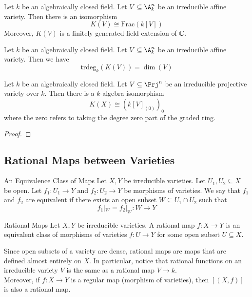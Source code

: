 \documentclass[a4paper]{article}
\begin{document}
\begin{prp}{}{} Let $k$ be an algebraically closed field. Let $V\subseteq\A_k^n$ be an irreducible affine variety. Then there is an isomorphism $$K(V)\cong\text{Frac}(k[V])$$ Moreover, $K(V)$ is a finitely generated field extension of $\mathbb{C}$. 
\end{prp}

\begin{prp}{}{} Let $k$ be an algebraically closed field. Let $V\subseteq\A_k^n$ be an irreducible affine variety. Then we have $$\text{trdeg}_k(K(V))=\dim(V)$$
\end{prp}

\begin{prp}{}{} Let $k$ be an algebraically closed field. Let $V\subseteq\Prj^n$ be an irreducible projective variety over $k$. Then there is a $k$-algebra isomorphism $$K(X)\cong(k[V]_{(0)})_0$$ where the zero refers to taking the degree zero part of the graded ring. 
\begin{proof}
\end{proof}
\end{prp}

\subsection{Rational Maps between Varieties}
\begin{defn}{An Equivalence Class of Maps}{} Let $X,Y$ be irreducible varieties. Let $U_1,U_2\subseteq X$ be open. Let $f_1:U_1\to Y$ and $f_2:U_2\to Y$ be morphisms of varieties. We say that $f_1$ and $f_2$ are equivalent if there exists an open subset $W\subseteq U_1\cap U_2$ such that $$f_1|_W=f_2|_W:W\to Y$$
\end{defn}

\begin{defn}{Rational Maps}{} Let $X,Y$ be irreducible varieties. A rational map $f:X\to Y$ is an equivalent class of morphisms of varieties $f:U\to Y$ for some open subset $U\subseteq X$. 
\end{defn}

Since open subsets of a variety are dense, rational maps are maps that are defined almost entirely on $X$. In particular, notice that rational functions on an irreducible variety $V$ is the same as a rational map $V\to k$. \\

Moreover, if $f:X\to Y$ is a regular map (morphism of varieties), then $[(X,f)]$ is also a rational map. 
\end{document}
